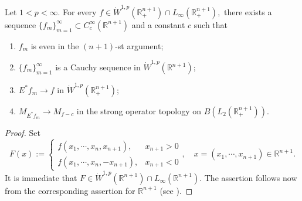\documentclass[12pt]{amsart}
\begin{document}
\begin{lemma}\label{density lemma} Let $1<p<\infty.$ For every $f \in \dot{W}^{1,p}(\mathbb{R}_+^{n+1})\cap L_{\infty}(\mathbb{R}_+^{n+1}),$ there exists a sequence $\{f_m\}_{m=1}^\infty \subset C^{\infty}_c(\mathbb{R}^{n+1})$ and {\color{blue}a constant $c$} such that
\begin{enumerate}[{\rm (i)}]
\item $f_m$ is even in the $(n+1)$-st argument;
\item $\{f_m\}_{m=1}^\infty$ is a Cauchy sequence in $\dot{W}^{1,p}(\mathbb{R}^{n+1});$
\item $E^{\ast}f_m\to f$ in $\dot{W}^{1,p}(\mathbb{R}_+^{n+1});$
\item $M_{E^{\ast}f_m}\rightarrow M_{f-c}$ in the strong operator topology on $B(L_2(\mathbb{R}^{n+1}_+))$.
\end{enumerate}	
\end{lemma}
\begin{proof} Set
$$F(x):=
\begin{cases}
f(x_1,\cdots,x_n,x_{n+1}),& x_{n+1}>0\\
f(x_1,\cdots,x_n,-x_{n+1}),& x_{n+1}<0
\end{cases},\quad x=(x_1,\cdots,x_{n+1})\in\mathbb{R}^{n+1}.
$$
It is immediate that $F\in\dot{W}^{1,p}(\mathbb{R}^{n+1})\cap L_{\infty}(\mathbb{R}^{n+1}).$ The assertion follows now from the corresponding assertion for $\mathbb{R}^{n+1}$ (see \cite[Theorem 3]{LMSZ}).
\end{proof}
\end{document}
